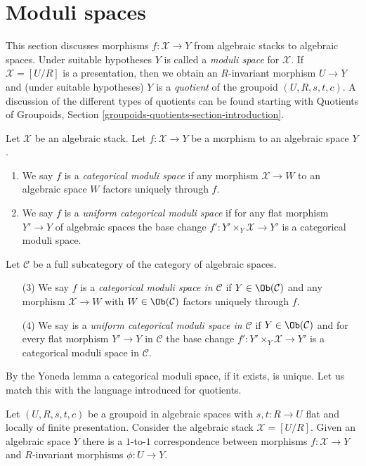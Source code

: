 \section{Moduli spaces}
\label{section-moduli-spaces}

\noindent
This section discusses morphisms $f : \mathcal{X} \to Y$ from
algebraic stacks to algebraic spaces. Under suitable hypotheses
$Y$ is called a {\it moduli space} for $\mathcal{X}$. If
$\mathcal{X} = [U/R]$ is a presentation, then we obtain an
$R$-invariant morphism $U \to Y$ and (under suitable hypotheses)
$Y$ is a {\it quotient} of the groupoid $(U, R, s, t, c)$.
A discussion of the different types of quotients can be found
starting with
Quotients of Groupoids, Section \ref{groupoids-quotients-section-introduction}.

\begin{definition}
\label{definition-categorical-quotient}
Let $\mathcal{X}$ be an algebraic stack. Let
$f : \mathcal{X} \to Y$ be a morphism to an algebraic space $Y$.
\begin{enumerate}
\item We say $f$ is a {\it categorical moduli space} if any morphism
$\mathcal{X} \to W$ to an algebraic space $W$ factors uniquely through $f$.
\item We say $f$ is a {\it uniform categorical moduli space}
if for any flat morphism $Y' \to Y$ of algebraic spaces the base change
$f' : Y' \times_Y \mathcal{X} \to Y'$ is a categorical moduli space.
\end{enumerate}
Let $\mathcal{C}$ be a full subcategory of the category of algebraic
spaces.
\begin{enumerate}
\item[(3)] We say $f$ is a {\it categorical moduli space in $\mathcal{C}$}
if $Y \in \Ob(\mathcal{C})$ and any morphism $\mathcal{X} \to W$ with
$W \in \Ob(\mathcal{C})$ factors uniquely through $f$.
\item[(4)] We say is a {\it uniform categorical moduli space in $\mathcal{C}$}
if $Y \in \Ob(\mathcal{C})$ and for every flat morphism $Y' \to Y$ in
$\mathcal{C}$ the base change $f' : Y' \times_Y \mathcal{X} \to Y'$ is a
categorical moduli space in $\mathcal{C}$.
\end{enumerate}
\end{definition}

\noindent
By the Yoneda lemma a categorical moduli space, if it exists, is unique.
Let us match this with the language introduced for quotients.

\begin{lemma}
\label{lemma-quotient-compare}
Let $(U, R, s, t, c)$ be a groupoid in algebraic spaces with
$s, t : R \to U$ flat and locally of finite presentation.
Consider the algebraic stack $\mathcal{X} = [U/R]$.
Given an algebraic space $Y$ there is a $1$-to-$1$ correspondence between
morphisms $f : \mathcal{X} \to Y$ and $R$-invariant morphisms
$\phi : U \to Y$.
\end{lemma}

